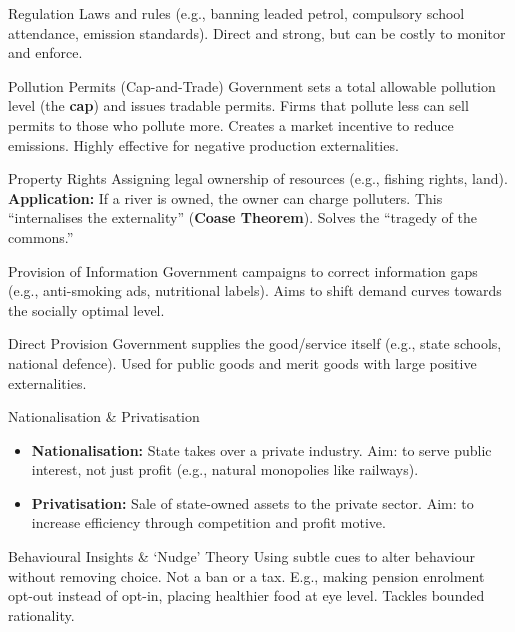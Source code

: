 \documentclass[11pt, a4paper, twoside]{book}
\begin{document}
\begin{keyterm}{Regulation}
Laws and rules (e.g., banning leaded petrol, compulsory school attendance, emission standards). Direct and strong, but can be costly to monitor and enforce.
\end{keyterm}

\begin{keyterm}{Pollution Permits (Cap-and-Trade)}
Government sets a total allowable pollution level (the \textbf{cap}) and issues tradable permits. Firms that pollute less can sell permits to those who pollute more. Creates a market incentive to reduce emissions. Highly effective for negative production externalities.
\end{keyterm}

\begin{keyterm}{Property Rights}
Assigning legal ownership of resources (e.g., fishing rights, land). \textbf{Application:} If a river is owned, the owner can charge polluters. This ``internalises the externality'' (\textbf{Coase Theorem}). Solves the ``tragedy of the commons.''
\end{keyterm}

\begin{keyterm}{Provision of Information}
Government campaigns to correct information gaps (e.g., anti-smoking ads, nutritional labels). Aims to shift demand curves towards the socially optimal level.
\end{keyterm}

\begin{keyterm}{Direct Provision}
Government supplies the good/service itself (e.g., state schools, national defence). Used for public goods and merit goods with large positive externalities.
\end{keyterm}

\begin{keyterm}{Nationalisation \& Privatisation}
\begin{itemize}
  \item \textbf{Nationalisation:} State takes over a private industry. Aim: to serve public interest, not just profit (e.g., natural monopolies like railways).
  \item \textbf{Privatisation:} Sale of state-owned assets to the private sector. Aim: to increase efficiency through competition and profit motive.
\end{itemize}
\end{keyterm}

\begin{keyterm}{Behavioural Insights \& `Nudge' Theory}
Using subtle cues to alter behaviour without removing choice. Not a ban or a tax. E.g., making pension enrolment opt-out instead of opt-in, placing healthier food at eye level. Tackles bounded rationality.
\end{keyterm}
\end{document}

